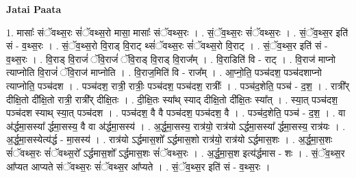 \documentclass[17pt]{extarticle}
\begin{document}
\textbf{Jatai Paata} \newline

1. मासाः᳚ संॅवथ्स॒रः सं॑ॅवथ्स॒रो मासा॒ मासाः᳚ संॅवथ्स॒रः । . सं॒ॅव॒थ्स॒रः सं॑ॅवथ्स॒रः । . सं॒ॅव॒थ्स॒र इति॑ सं - व॒थ्स॒रः । . सं॒ॅव॒थ्स॒रो वि॒राड् वि॒राट् थ्सं॑ॅवथ्स॒रः सं॑ॅवथ्स॒रो वि॒राट् । . सं॒ॅव॒थ्स॒र इति॑ सं - व॒थ्स॒रः । . वि॒राड् वि॒राजं॑ ॅवि॒राजं॑ ॅवि॒राड् वि॒राड् वि॒राज᳚म् । . वि॒राडिति॑ वि - राट् । . वि॒राज॑ माप्नो त्याप्नोति वि॒राजं॑ ॅवि॒राज॑ माप्नोति । . वि॒राज॒मिति॑ वि - राज᳚म् । . आ॒प्नो॒ति॒ पञ्च॑दश॒ पञ्च॑दशाप्नो त्याप्नोति॒ पञ्च॑दश । . पञ्च॑दश॒ रात्री॒ रात्रीः॒ पञ्च॑दश॒ पञ्च॑दश॒ रात्रीः᳚ । . पञ्च॑द॒शेति॒ पञ्च॑ - द॒श॒ । . रात्री᳚र् दीक्षि॒तो दी᳚क्षि॒तो रात्री॒ रात्री᳚र् दीक्षि॒तः । . दी॒क्षि॒तः स्या᳚थ् स्याद् दीक्षि॒तो दी᳚क्षि॒तः स्या᳚त् । . स्या॒त् पञ्च॑दश॒ पञ्च॑दश स्याथ् स्या॒त् पञ्च॑दश । . पञ्च॑दश॒ वै वै पञ्च॑दश॒ पञ्च॑दश॒ वै । . पञ्च॑द॒शेति॒ पञ्च॑ - द॒श॒ । . वा अ॑र्द्धमा॒सस्या᳚ र्द्धमा॒सस्य॒ वै वा अ॑र्द्धमा॒सस्य॑ । . अ॒र्द्ध॒मा॒सस्य॒ रात्र॑यो॒ रात्र॑यो ऽर्द्धमा॒सस्या᳚ र्द्धमा॒सस्य॒ रात्र॑यः । . अ॒र्द्ध॒मा॒सस्येत्य॑र्द्ध - मा॒सस्य॑ । . रात्र॑यो ऽर्द्धमास॒शो᳚ ऽर्द्धमास॒शो रात्र॑यो॒ रात्र॑यो ऽर्द्धमास॒शः । . अ॒र्द्ध॒मा॒स॒शः सं॑ॅवथ्स॒रः सं॑ॅवथ्स॒रो᳚ ऽर्द्धमास॒शो᳚ ऽर्द्धमास॒शः सं॑ॅवथ्स॒रः । . अ॒र्द्ध॒मा॒स॒श इत्य॑र्द्धमास - शः । . सं॒ॅव॒थ्स॒र आ᳚प्यत आप्यते संॅवथ्स॒रः सं॑ॅवथ्स॒र आ᳚प्यते । . सं॒ॅव॒थ्स॒र इति॑ सं - व॒थ्स॒रः । \newline
\end{document}

